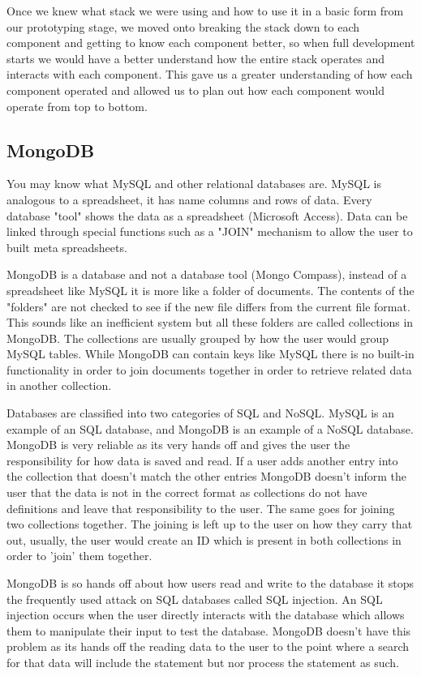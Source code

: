 Once we knew what stack we were using and how to use it in a basic form from our prototyping stage, we moved onto breaking the stack down to each component and getting to know each component better, so when full development starts we would have a better understand how the entire stack operates and interacts with each component. This gave us a greater understanding of how each component operated and allowed us to plan out how each component would operate from top to bottom. \cite{12931134620180301}

\subsection{MongoDB}
You may know what MySQL and other relational databases are. MySQL is analogous to a spreadsheet, it has name columns and rows of data. Every database "tool" shows the data as a spreadsheet (Microsoft Access). Data can be linked through special functions such as a "JOIN" mechanism to allow the user to built meta spreadsheets. \cite{gmit.19773820130101}

MongoDB is a database and not a database tool (Mongo Compass), instead of a spreadsheet like MySQL it is more like a folder of documents. The contents of the "folders" are not checked to see if the new file differs from the current file format. This sounds like an inefficient system but all these folders are called collections in MongoDB. The collections are usually grouped by how the user would group MySQL tables. While MongoDB can contain keys like MySQL there is no built-in functionality in order to join documents together in order to retrieve related data in another collection.

Databases are classified into two categories of SQL and NoSQL. MySQL is an example of an SQL database, and MongoDB is an example of a NoSQL database. MongoDB is very reliable as its very hands off and gives the user the responsibility for how data is saved and read. If a user adds another entry into the collection that doesn't match the other entries MongoDB doesn't inform the user that the data is not in the correct format as collections do not have definitions and leave that responsibility to the user. The same goes for joining two collections together. The joining is left up to the user on how they carry that out, usually, the user would create an ID which is present in both collections in order to 'join' them together.

MongoDB is so hands off about how users read and write to the database it stops the frequently used attack on SQL databases called SQL injection. An SQL injection occurs when the user directly interacts with the database which allows them to manipulate their input to test the database. MongoDB doesn't have this problem as its hands off the reading data to the user to the point where a search for that data will include the statement but nor process the statement as such. \cite{gmit.19773820130101}

